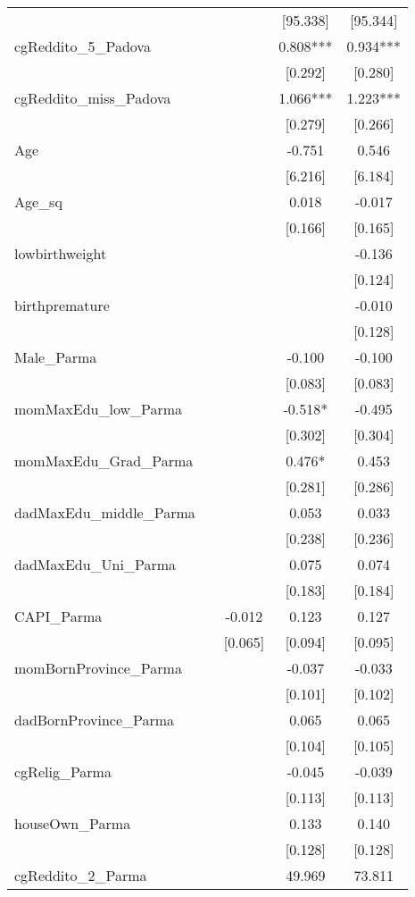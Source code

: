 \documentclass[]{article}
\begin{document}
\begin{tabular}{lcccc}
 &  &  & [95.338] & [95.344] \\
cgReddito\_5\_Padova &  &  & 0.808*** & 0.934*** \\
 &  &  & [0.292] & [0.280] \\
cgReddito\_miss\_Padova &  &  & 1.066*** & 1.223*** \\
 &  &  & [0.279] & [0.266] \\
Age &  &  & -0.751 & 0.546 \\
 &  &  & [6.216] & [6.184] \\
Age\_sq &  &  & 0.018 & -0.017 \\
 &  &  & [0.166] & [0.165] \\
lowbirthweight &  &  &  & -0.136 \\
 &  &  &  & [0.124] \\
birthpremature &  &  &  & -0.010 \\
 &  &  &  & [0.128] \\
Male\_Parma &  &  & -0.100 & -0.100 \\
 &  &  & [0.083] & [0.083] \\
momMaxEdu\_low\_Parma &  &  & -0.518* & -0.495 \\
 &  &  & [0.302] & [0.304] \\
momMaxEdu\_Grad\_Parma &  &  & 0.476* & 0.453 \\
 &  &  & [0.281] & [0.286] \\
dadMaxEdu\_middle\_Parma &  &  & 0.053 & 0.033 \\
 &  &  & [0.238] & [0.236] \\
dadMaxEdu\_Uni\_Parma &  &  & 0.075 & 0.074 \\
 &  &  & [0.183] & [0.184] \\
CAPI\_Parma &  & -0.012 & 0.123 & 0.127 \\
 &  & [0.065] & [0.094] & [0.095] \\
momBornProvince\_Parma &  &  & -0.037 & -0.033 \\
 &  &  & [0.101] & [0.102] \\
dadBornProvince\_Parma &  &  & 0.065 & 0.065 \\
 &  &  & [0.104] & [0.105] \\
cgRelig\_Parma &  &  & -0.045 & -0.039 \\
 &  &  & [0.113] & [0.113] \\
houseOwn\_Parma &  &  & 0.133 & 0.140 \\
 &  &  & [0.128] & [0.128] \\
cgReddito\_2\_Parma &  &  & 49.969 & 73.811 \\

\end{tabular}
\end{document}
